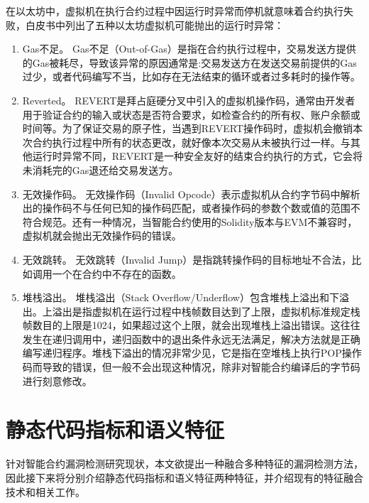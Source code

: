 在以太坊中，虚拟机在执行合约过程中因运行时异常而停机就意味着合约执行失败，白皮书中列出了五种以太坊虚拟机可能抛出的运行时异常：
\begin{enumerate}[label=(\arabic*)]
    \item Gas不足。
    Gas不足（Out-of-Gas）是指在合约执行过程中，交易发送方提供的Gas被耗尽，导致该异常的原因通常是:交易发送方在发送交易前提供的Gas过少，或者代码编写不当，比如存在无法结束的循环或者过多耗时的操作等。
    \item Reverted。
    REVERT是拜占庭硬分叉中引入的虚拟机操作码，通常由开发者用于验证合约的输入或状态是否符合要求，如检查合约的所有权、账户余额或时间等。为了保证交易的原子性，当遇到REVERT操作码时，虚拟机会撤销本次合约执行过程中所有的状态更改，就好像本次交易从未被执行过一样。与其他运行时异常不同，REVERT是一种安全友好的结束合约执行的方式，它会将未消耗完的Gas退还给交易发送方。
    \item 无效操作码。
    无效操作码（Invalid Opcode）表示虚拟机从合约字节码中解析出的操作码不与任何已知的操作码匹配，或者操作码的参数个数或值的范围不符合规范。还有一种情况，当智能合约使用的Solidity版本与EVM不兼容时，虚拟机就会抛出无效操作码的错误。
    \item 无效跳转。
    无效跳转（Invalid Jump）是指跳转操作码的目标地址不合法，比如调用一个在合约中不存在的函数。
    \item 堆栈溢出。
    堆栈溢出（Stack Overflow/Underflow）包含堆栈上溢出和下溢出。上溢出是指虚拟机在运行过程中栈帧数目达到了上限，虚拟机标准规定栈帧数目的上限是1024，如果超过这个上限，就会出现堆栈上溢出错误。这往往发生在递归调用中，递归函数中的退出条件永远无法满足，解决方法就是正确编写递归程序。堆栈下溢出的情况非常少见，它是指在空堆栈上执行POP操作码而导致的错误，但一般不会出现这种情况，除非对智能合约编译后的字节码进行刻意修改。
\end{enumerate}

\section{静态代码指标和语义特征}
针对智能合约漏洞检测研究现状，本文欲提出一种融合多种特征的漏洞检测方法，因此接下来将分别介绍静态代码指标和语义特征两种特征，并介绍现有的特征融合技术和相关工作。
